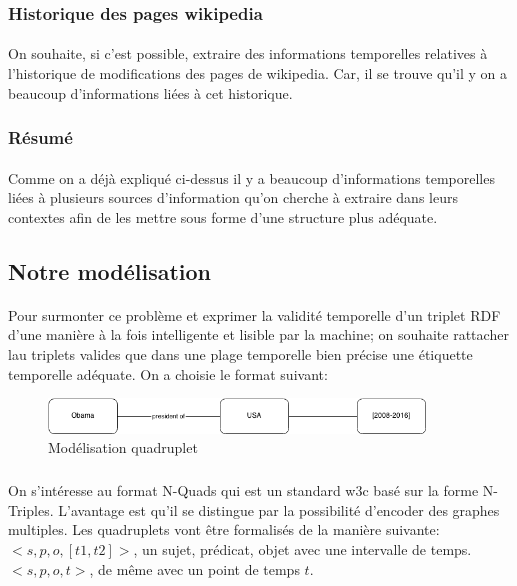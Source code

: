 \subsubsection*{Historique des pages wikipedia}
\paragraph{}
On souhaite, si c’est possible, extraire des informations temporelles relatives à l’historique de modifications des pages de wikipedia. Car, il se trouve qu’il y on a beaucoup d’informations liées à cet historique.
\subsubsection*{Résumé}
\paragraph{}
Comme on a déjà expliqué ci-dessus il y a beaucoup d’informations temporelles liées à plusieurs sources d’information qu’on cherche à extraire dans leurs contextes afin de les mettre sous forme d’une structure plus adéquate.
\subsection*{Notre modélisation}
\paragraph{}
Pour surmonter ce problème et exprimer la validité temporelle d’un triplet RDF d’une manière à la fois intelligente et lisible par la machine; on souhaite rattacher lau triplets valides que dans une plage temporelle bien précise une étiquette temporelle adéquate.
\newline
On a choisie le format suivant:
\begin{figure}[H]
        \centering
                \centering
                \includegraphics[width=10cm]{obamaQuad.png}
               \caption{Modélisation quadruplet}

\end{figure}
\subparagraph{}
On s'intéresse au format N-Quads qui est un standard w3c basé sur la forme N-Triples. L’avantage est qu’il se distingue par la possibilité d’encoder des graphes multiples.
Les quadruplets vont être formalisés de la manière suivante:
\newline
$<s,p,o,[t1,t2]>$, un sujet, prédicat, objet avec une intervalle de temps.
\newline
$<s,p,o,t>$, de même avec un point de temps $t$.
